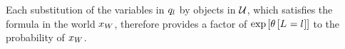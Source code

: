 %
%



Each substitution of the variables in $q_{l}$ by objects in $\mathcal{U}$, which satisfies the formula in the world $x_{W}$, therefore provides a factor of $\mathrm{exp}\left[\theta\left[L_{}=l_{}\right]\right]$ to the probability of $x_{W}$.



